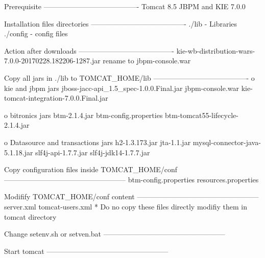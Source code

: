 Prerequisite
----------------------------------------
Tomcat 8.5
JBPM and KIE 7.0.0


Installation files directories
----------------------------------------
./lib - Libraries
./config - config files

Action after downloads
----------------------------------------
kie-wb-distribution-wars-7.0.0-20170228.182206-1287.jar rename to jbpm-console.war


Copy all jars in ./lib to TOMCAT_HOME/lib
----------------------------------------
o kie and jbpm jars
jboss-jacc-api_1.5_spec-1.0.0.Final.jar
jbpm-console.war
kie-tomcat-integration-7.0.0.Final.jar

o bitronics jars
btm-2.1.4.jar
btm-config.properties
btm-tomcat55-lifecycle-2.1.4.jar

o Datasource and transactions jars
h2-1.3.173.jar
jta-1.1.jar
mysql-connector-java-5.1.18.jar
slf4j-api-1.7.7.jar
slf4j-jdk14-1.7.7.jar


Copy configuration files inside TOMCAT_HOME/conf
---------------------------------------------------
btm-config.properties
resources.properties


Modifify TOMCAT_HOME/conf content
---------------------------------------------------
server.xml
tomcat-users.xml
* Do no copy these files directly modifiy them in tomcat directory

Change setenv.sh or setven.bat
---------------------------------------------------

Start tomcat
---------------------------------------------------

